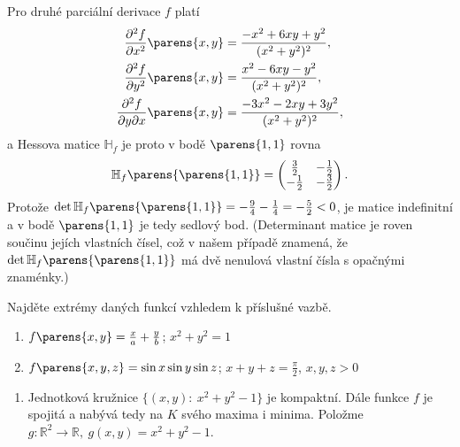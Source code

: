 \documentclass[answers]{exam}
\begin{document}
\begin{questions}
\begin{solution}
\begin{enumerate}[label=(\roman*)]
				Pro druhé parciální derivace $f$ platí
				\begin{align*}
					 \frac{\partial^2 f}{\partial x^2}\parens{x,y}&=\frac{-x^2 + 6xy + y^2}{(x^2+y^2)^2},
					 \\  
					 \frac{\partial^2 f}{\partial y^2}\parens{x,y}&=\frac{x^2 - 6xy - y^2}{(x^2+y^2)^2},
					 \\
					 \frac{\partial^2 f}{\partial y\partial x}\parens{x,y}&=\frac{-3x^2 - 2xy + 3y^2}{(x^2+y^2)^2},
				\end{align*}
				a Hessova matice $\mathbb{H}_f$ je proto v bodě $\parens{1, 1}$ rovna
				\begin{equation*}
					\mathbb{H}_f \parens{\parens{1, 1}}
					=
					\begin{pmatrix}
						\frac{3}{2} & -\frac{1}{2}
						\\
						-\frac{1}{2} & -\frac{3}{2}
					\end{pmatrix}.
				\end{equation*}
				Protože $\det \mathbb{H}_f \parens{\parens{1, 1}} = -\frac{9}{4} - \frac{1}{4} = -\frac{5}{2} < 0$, je matice indefinitní a v bodě $\parens{1, 1}$ je tedy sedlový bod. (Determinant matice je roven součinu jejích vlastních čísel, což v našem případě znamená, že $\det \mathbb{H}_f \parens{\parens{1, 1}}$ má dvě nenulová vlastní čísla s opačnými znaménky.)
		\end{enumerate}
  \end{solution}
  
  \question
  Najděte extrémy daných funkcí vzhledem k příslušné vazbě.
	\begin{enumerate}[label=(\roman*)]
		\item $f\parens{x, y} = \frac{x}{a} + \frac{y}{b}$; \quad $x^2 + y^2 = 1$
		\item $f\parens{x, y, z} = \sin x \sin y \sin z$; \quad $x + y + z = \frac{\pi}{2}$, \quad $x, y, z > 0$
	\end{enumerate}
	
	\begin{solution}
		\begin{enumerate}[label=(\roman*)]
			\item 
			
				Jednotkov\'a kru\v znice $\{(x,y):\ x^2+y^2-1\}$ je kompaktn\'i. D\'ale funkce $f$ je spojit\'a a nab\'yv\'a tedy na $K$ sv\'eho maxima i minima. Polo\v zme $g:\mathbb R^2\to\mathbb R,\ g(x,y)=x^2+y^2-1$.
				

\end{enumerate}
\end{solution}
\end{questions}
\end{document}
